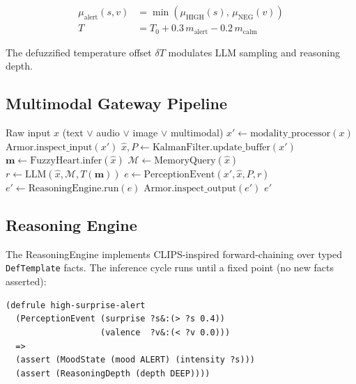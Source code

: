 \documentclass[12pt,a4paper]{article}
\begin{document}
\begin{align}
  \mu_{\text{alert}}(s,v) &= \min\!\left(\mu_\text{HIGH}(s),\, \mu_\text{NEG}(v)\right) \\
  T &= T_0 + 0.3\,m_{\text{alert}} - 0.2\,m_{\text{calm}}
\end{align}

The defuzzified temperature offset $\delta T$ modulates LLM sampling and reasoning depth.

\subsection{Multimodal Gateway Pipeline}

\begin{algorithm}[H]
\caption{Multimodal Gateway Request Pipeline}
\begin{algorithmic}[1]
\Require Raw input $x$ (text $\vee$ audio $\vee$ image $\vee$ multimodal)
\State $x' \leftarrow \mathrm{modality\_processor}(x)$
\State $\mathrm{Armor.inspect\_input}(x')$
\State $\hat{x}, P \leftarrow \mathrm{KalmanFilter.update\_buffer}(x')$
\State $\mathbf{m} \leftarrow \mathrm{FuzzyHeart.infer}(\hat{x})$
\State $\mathcal{M} \leftarrow \mathrm{MemoryQuery}(\hat{x})$
\State $r \leftarrow \mathrm{LLM}(\hat{x}, \mathcal{M}, T(\mathbf{m}))$
\State $e \leftarrow \mathrm{PerceptionEvent}(x', \hat{x}, P, r)$
\State $e' \leftarrow \mathrm{ReasoningEngine.run}(e)$
\State $\mathrm{Armor.inspect\_output}(e')$
\State \Return $e'$
\end{algorithmic}
\end{algorithm}

\subsection{Reasoning Engine}

The ReasoningEngine implements CLIPS-inspired forward-chaining over typed \texttt{DefTemplate} facts.
The inference cycle runs until a fixed point (no new facts asserted):

\begin{lstlisting}[language={}, caption={CLIPS-pattern rule example (Rust DSL)}]
(defrule high-surprise-alert
  (PerceptionEvent (surprise ?s&:(> ?s 0.4))
                   (valence  ?v&:(< ?v 0.0)))
  =>
  (assert (MoodState (mood ALERT) (intensity ?s)))
  (assert (ReasoningDepth (depth DEEP))))
\end{lstlisting}
\end{document}
